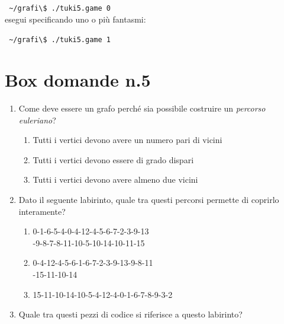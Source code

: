 \documentclass[8pt]{book}
\begin{document}
\texttt{
  \newline
  \textasciitilde{}/grafi\textbackslash{}\$ ./tuki5.game 0
  }\\

esegui specificando uno o più fantasmi:

\texttt{
  \newline
  \textasciitilde{}/grafi\textbackslash{}\$ ./tuki5.game 1
  }

\newpage
\section*{Box domande n.5}\label{tocux5f109}

\begin{enumerate}
\item Come deve essere un grafo perché sia possibile costruire un \emph{percorso euleriano}?

\begin{enumerate}
\def\labelenumi{\alph{enumi}.}

\item
  Tutti i vertici devono avere un numero pari di vicini
\item
  Tutti i vertici devono essere di grado dispari
\item
  Tutti i vertici devono avere almeno due vicini
\end{enumerate}

\item Dato il seguente labirinto, quale tra questi percorsi permette di coprirlo interamente?

\begin{enumerate}
\def\labelenumi{\alph{enumi}.}

\item
  0-1-6-5-4-0-4-12-4-5-6-7-2-3-9-13\\
  -9-8-7-8-11-10-5-10-14-10-11-15
\item
  0-4-12-4-5-6-1-6-7-2-3-9-13-9-8-11\\
  -15-11-10-14
\item
  15-11-10-14-10-5-4-12-4-0-1-6-7-8-9-3-2
\end{enumerate}

\item Quale tra questi pezzi di codice si riferisce a questo labirinto?

\begin{enumerate}
\def\labelenumi{\alph{enumi}.}


\end{enumerate}
\end{enumerate}
\end{document}
